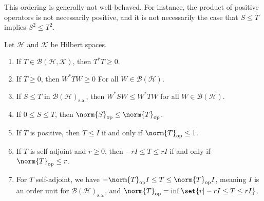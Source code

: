 \documentclass[10pt]{mypackage}
\newcommand{\sa}{\text{s.a.}}
\begin{document}
\begin{remark}
  This ordering is generally not well-behaved. For instance, the product of positive operators is not necessarily positive, and it is not necessarily the case that $S\leq T$ implies $S^2 \leq T^2$.
\end{remark}
\begin{proposition}
  Let $\mathcal{H}$ and $\mathcal{K}$ be Hilbert spaces.
  \begin{enumerate}[(1)]
    \item If $T\in \mathcal{B}\left(\mathcal{H},\mathcal{K}\right)$, then $T^{\ast}T \geq 0$.
    \item If $T\geq 0$, then $W^{\ast}TW \geq 0$ For all $W\in \mathcal{B}\left(\mathcal{H}\right)$.
    \item If $S\leq T$ in $\mathcal{B}\left(\mathcal{H}\right)_{\sa}$, then $W^{\ast}SW \leq W^{\ast}TW$ for all $W\in \mathcal{B}\left(\mathcal{H}\right)$.
    \item If $0 \leq S \leq T$, then $\norm{S}_{\text{op}} \leq \norm{T}_{\text{op}}$.
    \item If $T$ is positive, then $T\leq I$ if and only if $\norm{T}_{\text{op}}\leq 1$.
    \item If $T$ is self-adjoint and $r\geq 0$, then $-rI \leq T \leq rI$ if and only if $\norm{T}_{\text{op}} \leq r$.
    \item For $T$ self-adjoint, we have $-\norm{T}_{\text{op}}I \leq T \leq \norm{T}_{\text{op}}I$, meaning $I$ is an order unit for $\mathcal{B}\left(\mathcal{H}\right)_{\sa}$, and $\norm{T}_{\text{op}} = \inf\set{r | -rI \leq T \leq rI}$.
  \end{enumerate}
\end{proposition}
\end{document}
